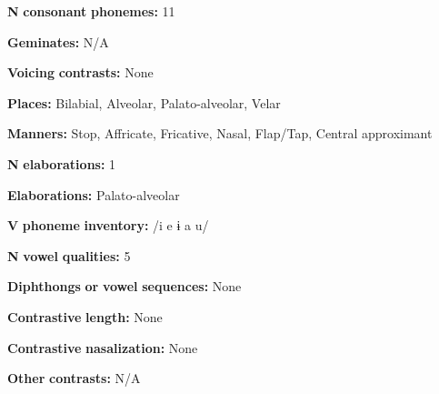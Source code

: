 \documentclass[output=paper]{langsci/langscibook}
\begin{document}
\begin{styleBody}
\textbf{N} \textbf{consonant} \textbf{phonemes:} 11
\end{styleBody}

\begin{styleBody}
\textbf{Geminates:} N/A
\end{styleBody}

\begin{styleBody}
\textbf{Voicing} \textbf{contrasts:} None
\end{styleBody}

\begin{styleBody}
\textbf{Places:} Bilabial, Alveolar, Palato-alveolar, Velar
\end{styleBody}

\begin{styleBody}
\textbf{Manners:} Stop, Affricate, Fricative, Nasal, Flap/Tap, Central approximant
\end{styleBody}

\begin{styleBody}
\textbf{N} \textbf{elaborations:} 1
\end{styleBody}

\begin{styleBody}
\textbf{Elaborations:} Palato-alveolar
\end{styleBody}

\begin{styleBody}
\textbf{V} \textbf{phoneme} \textbf{inventory:} /i e ɨ a u/
\end{styleBody}

\begin{styleBody}
\textbf{N} \textbf{vowel} \textbf{qualities:} 5
\end{styleBody}

\begin{styleBody}
\textbf{Diphthongs} \textbf{or} \textbf{vowel} \textbf{sequences:} None
\end{styleBody}

\begin{styleBody}
\textbf{Contrastive} \textbf{length:} None
\end{styleBody}

\begin{styleBody}
\textbf{Contrastive} \textbf{nasalization:} None
\end{styleBody}

\begin{styleBody}
\textbf{Other} \textbf{contrasts:} N/A
\end{styleBody}
\end{document}
